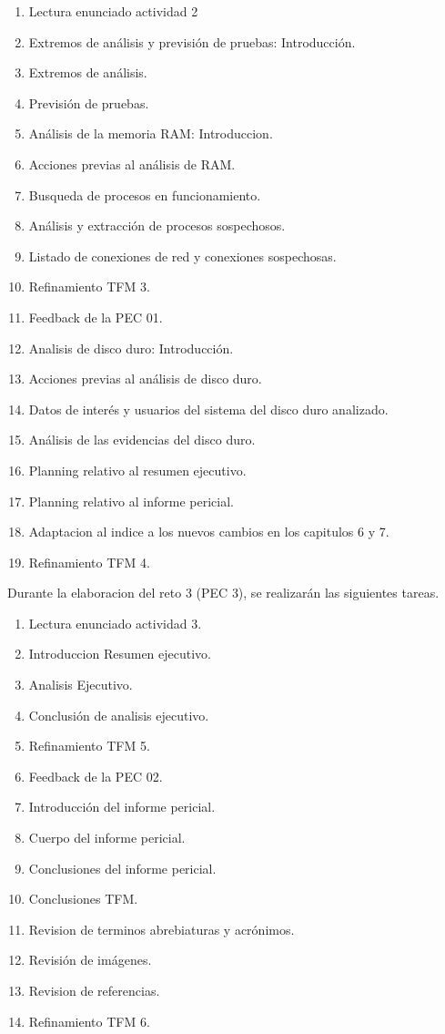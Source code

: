 \begin{enumerate}
    \item Lectura enunciado actividad 2
    \item Extremos de análisis y previsión de pruebas: Introducción.
    \item Extremos de análisis.
    \item Previsión de pruebas.
    \item Análisis de la memoria RAM: Introduccion.
    \item Acciones previas al análisis de RAM.
    \item Busqueda de procesos en funcionamiento.
    \item Análisis y extracción de procesos sospechosos.
    \item Listado de conexiones de red y conexiones sospechosas.
    \item Refinamiento TFM 3.
    \item Feedback de la PEC 01.
    \item Analisis de disco duro: Introducción.
    \item Acciones previas al análisis de disco duro.
    \item Datos de interés y usuarios del sistema del disco duro analizado.
    \item Análisis de las evidencias del disco duro.
    \item Planning relativo al resumen ejecutivo.
    \item Planning relativo al informe pericial.
    \item Adaptacion al indice a los nuevos cambios en los capitulos 6 y 7.
    \item Refinamiento TFM 4.
\end{enumerate}



\noindent Durante la elaboracion del reto 3  (PEC 3), se realizarán las siguientes tareas.

\begin{enumerate}
    \item Lectura enunciado actividad 3.
    \item Introduccion Resumen ejecutivo.
    \item Analisis Ejecutivo.
    \item Conclusión de analisis ejecutivo.
    \item Refinamiento TFM 5.
    \item Feedback de la PEC 02.
    \item Introducción del informe pericial.
    \item Cuerpo del informe pericial.
    \item Conclusiones del informe pericial.
    \item Conclusiones TFM.
    \item Revision de terminos abrebiaturas y acrónimos.
    \item Revisión de imágenes.
    \item Revision de referencias.
    \item Refinamiento TFM 6.
\end{enumerate}


